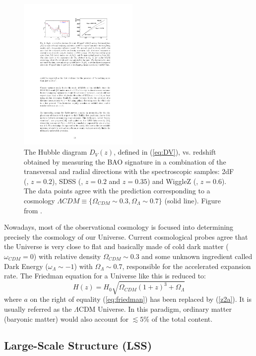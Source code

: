 \begin{figure}
\centering
\includegraphics[height=75mm]{./plots/dv_bao.pdf}
\caption{The Hubble diagram $D_V(z)$, defined in (\ref{eq:DV}), vs. redshift obtained by measuring the BAO signature in a combination of the transversal and radial directions with the spectroscopic samples: 2dF (\citet{Colless2001}, $z=0.2$), SDSS (\citet{York2000}, $z=0.2$ and $z=0.35$) and WiggleZ (\citet{Drinkwater2010}, $z=0.6$). The data points agree with the prediction corresponding to a cosmology $\Lambda CDM \equiv\lbrace \Omega_{CDM} \sim 0.3, \Omega_\Lambda \sim 0.7 \rbrace$ (solid line). Figure from \citet{Astier2012}.}
\label{fig:DV_bao}
\end{figure}

Nowadays, most of the observational cosmology is focused into determining precisely the cosmology of our Universe. Current cosmological probes agree that the Universe is very close to flat and basically made of cold dark matter ($\omega_{CDM} = 0$) with relative density $\Omega_{CDM} \sim 0.3$ and some unknown ingredient called Dark Energy ($\omega_\Lambda \sim -1$) with $\Omega_\Lambda \sim 0.7$, responsible for the accelerated expansion rate. The Friedman equation for a Universe like this is reduced to:
\begin{equation}
H(z) = H_0 \sqrt{\Omega_{CDM}(1+z)^3 + \Omega_\Lambda}
\end{equation}
where $a$ on the right of equality (\ref{eq:friedman}) has been replaced by (\ref{z2a}). It is usually referred as the $\Lambda$CDM Universe. In this paradigm, ordinary matter (baryonic matter) would also account for $\lesssim5\%$ of the total content.

\subsection{Large-Scale Structure (LSS)}
\label{sec:lss}

